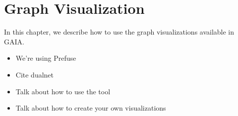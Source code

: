\chapter{Graph Visualization}
\label{visualization}
In this chapter, we describe how to use the graph visualizations
available in GAIA.

\begin{itemize}
\item We're using Prefuse
\item Cite dualnet
\item Talk about how to use the tool
\item Talk about how to create your own visualizations
\end{itemize}

